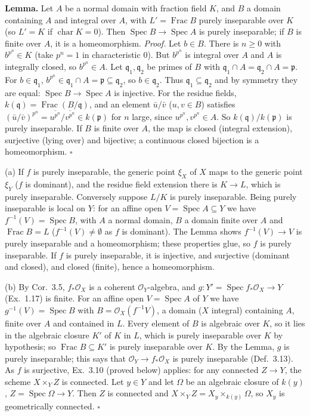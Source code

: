 \documentclass[11pt]{article}
\begin{document}
\textbf{Lemma.} Let $A$ be a normal domain with fraction field $K$, and $B$ a domain containing $A$ and integral over $A$, with $L'=\operatorname{Frac}B$ purely inseparable over $K$ (so $L'=K$ if $\operatorname{char}K=0$). Then $\operatorname{Spec}B\to\operatorname{Spec}A$ is purely inseparable; if $B$ is finite over $A$, it is a homeomorphism.
\emph{Proof.} Let $b\in B$. There is $n\ge0$ with $b^{p^n}\in K$ (take $p^n=1$ in characteristic $0$). But $b^{p^n}$ is integral over $A$ and $A$ is integrally closed, so $b^{p^n}\in A$. Let $\mathfrak q_1,\mathfrak q_2$ be primes of $B$ with $\mathfrak q_1\cap A=\mathfrak q_2\cap A=\mathfrak p$. For $b\in\mathfrak q_1$, $b^{p^n}\in\mathfrak q_1\cap A=\mathfrak p\subseteq\mathfrak q_2$, so $b\in\mathfrak q_2$. Thus $\mathfrak q_1\subseteq\mathfrak q_2$ and by symmetry they are equal: $\operatorname{Spec}B\to\operatorname{Spec}A$ is injective. For the residue fields, $k(\mathfrak q)=\operatorname{Frac}(B/\mathfrak q)$, and an element $\bar u/\bar v$ ($u,v\in B$) satisfies $(\bar u/\bar v)^{p^n}=\overline{u^{p^n}}/\overline{v^{p^n}}\in k(\mathfrak p)$ for $n$ large, since $u^{p^n},v^{p^n}\in A$. So $k(\mathfrak q)/k(\mathfrak p)$ is purely inseparable. If $B$ is finite over $A$, the map is closed (integral extension), surjective (lying over) and bijective; a continuous closed bijection is a homeomorphism. \hfill$\square$

(a) If $f$ is purely inseparable, the generic point $\xi_X$ of $X$ maps to the generic point $\xi_Y$ ($f$ is dominant), and the residue field extension there is $K\to L$, which is purely inseparable. Conversely suppose $L/K$ is purely inseparable. Being purely inseparable is local on $Y$: for an affine open $V=\operatorname{Spec}A\subseteq Y$ we have $f^{-1}(V)=\operatorname{Spec}B$, with $A$ a normal domain, $B$ a domain finite over $A$ and $\operatorname{Frac}B=L$ ($f^{-1}(V)\ne\emptyset$ as $f$ is dominant). The Lemma shows $f^{-1}(V)\to V$ is purely inseparable and a homeomorphism; these properties glue, so $f$ is purely inseparable. If $f$ is purely inseparable, it is injective, and surjective (dominant and closed), and closed (finite), hence a homeomorphism.

(b) By Cor.~3.5, $f_*\mathcal O_X$ is a coherent $\mathcal O_Y$-algebra, and $g:Y'=\operatorname{Spec}f_*\mathcal O_X\to Y$ (Ex.~1.17) is finite. For an affine open $V=\operatorname{Spec}A$ of $Y$ we have $g^{-1}(V)=\operatorname{Spec}B$ with $B=\mathcal O_X(f^{-1}V)$, a domain ($X$ integral) containing $A$, finite over $A$ and contained in $L$. Every element of $B$ is algebraic over $K$, so it lies in the algebraic closure $K'$ of $K$ in $L$, which is purely inseparable over $K$ by hypothesis; so $\operatorname{Frac}B\subseteq K'$ is purely inseparable over $K$. By the Lemma, $g$ is purely inseparable; this says that $\mathcal O_Y\to f_*\mathcal O_X$ is purely inseparable (Def.~3.13). As $f$ is surjective, Ex.~3.10 (proved below) applies: for any connected $Z\to Y$, the scheme $X\times_YZ$ is connected. Let $y\in Y$ and let $\Omega$ be an algebraic closure of $k(y)$, $Z=\operatorname{Spec}\Omega\to Y$. Then $Z$ is connected and $X\times_YZ=X_y\times_{k(y)}\Omega$, so $X_y$ is geometrically connected. \hfill$\square$
\end{document}
